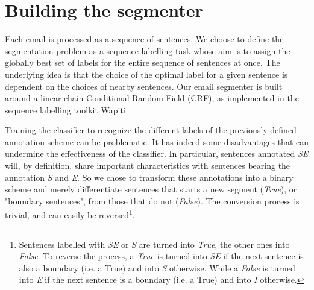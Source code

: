 
\section{Building the segmenter}
\label{sec:buildingTheSegmenter}
Each email is processed as a sequence of sentences.
We choose to define the segmentation problem as a sequence labelling task whose aim is to assign the globally best set of labels for the entire sequence of sentences at once. The underlying idea is that the choice of the optimal label for a given sentence is dependent on the choices of nearby sentences.
%
%
Our email segmenter is built around a linear-chain Conditional Random Field (CRF), as implemented in the sequence labelling toolkit Wapiti \cite{lavergne2010practical}.

Training the classifier to recognize the different labels of the previously defined annotation scheme can be problematic. It has indeed some disadvantages that can undermine the effectiveness of the classifier. In particular, sentences annotated \textit{SE} will, by definition, share important characteristics with sentences bearing the annotation \textit{S} and \textit{E}. 
So we chose to transform these annotations into a binary scheme and merely differentiate sentences that starts a new segment (\textit{True}), or "boundary sentences", from those that do not (\textit{False}). The conversion process is trivial, and can easily be reversed\footnote{Sentences labelled with \textit{SE} or \textit{S} are turned into \textit{True}, the other ones into \textit{False}. To reverse the process, a \textit{True} is turned into \textit{SE} if the next sentence is also a boundary (i.e. a True) and into \textit{S} otherwise. While a \textit{False} is turned into \textit{E} if the next sentence is a boundary (i.e. a True) and into  \textit{I} otherwise.}.

